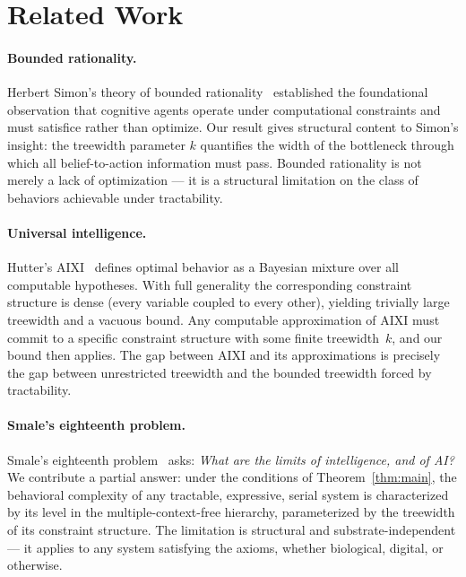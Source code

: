 \documentclass[11pt,a4paper]{article}
\theoremstyle{plain}
\theoremstyle{definition}
\theoremstyle{remark}
\begin{document}
\section{Related Work}\label{sec:related}

\paragraph{Bounded rationality.}
Herbert Simon's theory of bounded rationality~\cite{Simon55,Simon56} established the foundational observation that cognitive agents operate under computational constraints and must satisfice rather than optimize.
Our result gives structural content to Simon's insight: the treewidth parameter $k$ quantifies the width of the bottleneck through which all belief-to-action information must pass.
Bounded rationality is not merely a lack of optimization --- it is a structural limitation on the class of behaviors achievable under tractability.

\paragraph{Universal intelligence.}
Hutter's AIXI~\cite{Hutter04} defines optimal behavior as a Bayesian mixture over all computable hypotheses.
With full generality the corresponding constraint structure is dense (every variable coupled to every other), yielding trivially large treewidth and a vacuous bound.
Any computable approximation of AIXI must commit to a specific constraint structure with some finite treewidth~$k$, and our bound then applies.
The gap between AIXI and its approximations is precisely the gap between unrestricted treewidth and the bounded treewidth forced by tractability.

\paragraph{Smale's eighteenth problem.}
Smale's eighteenth problem~\cite{Smale98} asks: \emph{What are the limits of intelligence, and of AI?}
We contribute a partial answer: under the conditions of Theorem~\ref{thm:main}, the behavioral complexity of any tractable, expressive, serial system is characterized by its level in the multiple-context-free hierarchy, parameterized by the treewidth of its constraint structure.
The limitation is structural and substrate-independent --- it applies to any system satisfying the axioms, whether biological, digital, or otherwise.
\end{document}
